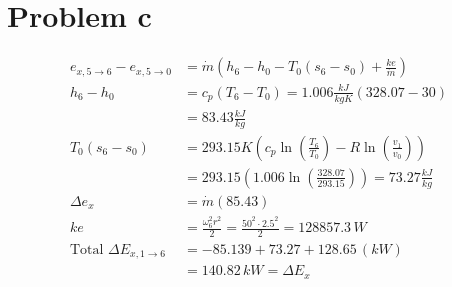 \section*{Problem c}

\begin{align*}
e_{x,5\rightarrow 6} - e_{x,5\rightarrow 0} &= \dot{m} \left( h_6 - h_0 - T_0 (s_6 - s_0) + \frac{ke}{\dot{m}} \right) \\
h_6 - h_0 &= c_p (T_6 - T_0) = 1.006 \frac{kJ}{kgK} (328.07 - 30) \\
&= 83.43 \frac{kJ}{kg} \\
T_0 (s_6 - s_0) &= 293.15 K \left( c_p \ln \left( \frac{T_6}{T_0} \right) - R \ln \left( \frac{v_1}{v_0} \right) \right) \\
&= 293.15 \left( 1.006 \ln \left( \frac{328.07}{293.15} \right) \right) = 73.27 \frac{kJ}{kg} \\
\Delta e_x &= \dot{m} (85.43) \\
ke &= \frac{\omega_6^2 r^2}{2} = \frac{50^2 \cdot 2.5^2}{2} = 128857.3 \, W \\
\text{Total } \Delta E_{x,1\rightarrow 6} &= -85.139 + 73.27 + 128.65 \, (kW) \\
&= 140.82 \, kW = \Delta E_x
\end{align*}